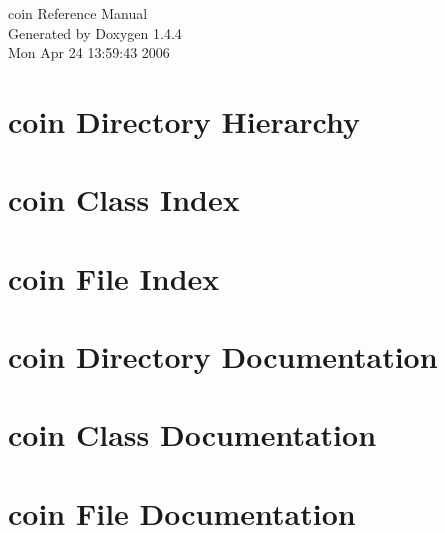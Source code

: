 \documentclass[a4paper]{book}
\begin{document}
\begin{titlepage}
\vspace*{7cm}
\begin{center}
{\Large coin Reference Manual}\\
\vspace*{1cm}
{\large Generated by Doxygen 1.4.4}\\
\vspace*{0.5cm}
{\small Mon Apr 24 13:59:43 2006}\\
\end{center}
\end{titlepage}
\clearemptydoublepage
{}
\tableofcontents
\clearemptydoublepage
{}
\chapter{coin Directory Hierarchy}

\chapter{coin Class Index}

\chapter{coin File Index}

\chapter{coin Directory Documentation}

\chapter{coin Class Documentation}

\chapter{coin File Documentation}









\printindex
\end{document}
